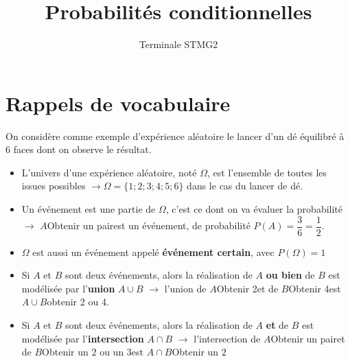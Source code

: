 \documentclass{article}
\title{Probabilités conditionnelles}
\author{Terminale STMG2}
\date{}
\begin{document}
\maketitle

\section{Rappels de vocabulaire}
On considère comme exemple d'expérience aléatoire le lancer d'un dé équilibré à 6 faces dont on observe le résultat.
\begin{tcolorbox}
\begin{itemize}
\item L'univers d'une expérience aléatoire, noté $\Omega$, est l'ensemble de toutes les issues possibles $\to \Omega = \{1;2;3;4;5;6\}$ dans le cas du lancer de dé.
\item Un événement est une partie de $\Omega$, c'est ce dont on va évaluer la probabilité $\to$ $A$\og Obtenir un pair\fg est un événement, de probabilité $P(A) = \dfrac{3}{6} = \dfrac{1}{2}$.
\item $\Omega$ est aussi un événement appelé \textbf{événement certain}, avec $P(\Omega) = 1$
\item Si $A$ et $B$ sont deux événements, alors la réalisation de $A$ \textbf{ou bien} de $B$ est modélisée par l'\textbf{union} $A \cup B$ $\to$ l'union de $A$\og Obtenir 2\fg et de $B$\og Obtenir 4\fg est $A \cup B$\og obtenir 2 ou 4\fg.
\item Si $A$ et $B$ sont deux événements, alors la réalisation de $A$ \textbf{et} de $B$ est modélisée par l'\textbf{intersection} $A \cap B$ $\to$ l'intersection de $A$\og Obtenir un pair\fg et de $B$\og Obtenir un $2$ ou un $3$\fg est $A \cap B$\og Obtenir un $2$\fg
\end{itemize}

\end{tcolorbox}
\end{document}

